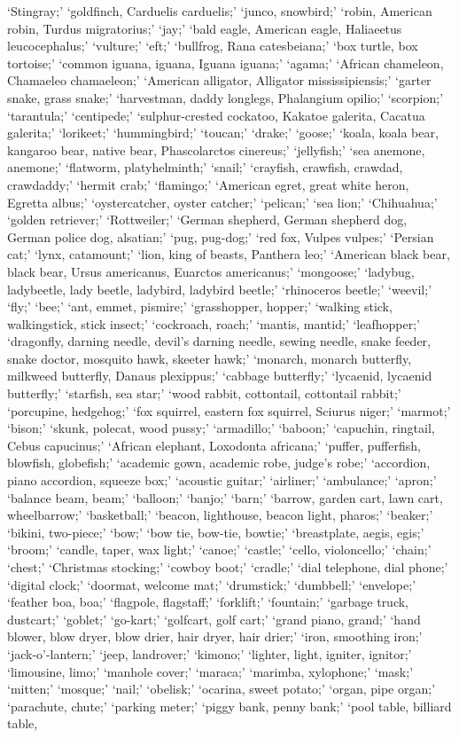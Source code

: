 \documentclass[10pt,twocolumn,letterpaper]{article}
\begin{document}
\noindent`Stingray;' `goldfinch, Carduelis carduelis;' `junco, snowbird;' `robin, American robin, Turdus migratorius;' `jay;' `bald eagle, American eagle, Haliaeetus leucocephalus;' `vulture;' `eft;' `bullfrog, Rana catesbeiana;' `box turtle, box tortoise;' `common iguana, iguana, Iguana iguana;' `agama;' `African chameleon, Chamaeleo chamaeleon;' `American alligator, Alligator mississipiensis;' `garter snake, grass snake;' `harvestman, daddy longlegs, Phalangium opilio;' `scorpion;' `tarantula;' `centipede;' `sulphur-crested cockatoo, Kakatoe galerita, Cacatua galerita;' `lorikeet;' `hummingbird;' `toucan;' `drake;' `goose;' `koala, koala bear, kangaroo bear, native bear, Phascolarctos cinereus;' `jellyfish;' `sea anemone, anemone;' `flatworm, platyhelminth;' `snail;' `crayfish, crawfish, crawdad, crawdaddy;' `hermit crab;' `flamingo;' `American egret, great white heron, Egretta albus;' `oystercatcher, oyster catcher;' `pelican;' `sea lion;' `Chihuahua;' `golden retriever;' `Rottweiler;' `German shepherd, German shepherd dog, German police dog, alsatian;' `pug, pug-dog;' `red fox, Vulpes vulpes;' `Persian cat;' `lynx, catamount;' `lion, king of beasts, Panthera leo;' `American black bear, black bear, Ursus americanus, Euarctos americanus;' `mongoose;' `ladybug, ladybeetle, lady beetle, ladybird, ladybird beetle;' `rhinoceros beetle;' `weevil;' `fly;' `bee;' `ant, emmet, pismire;' `grasshopper, hopper;' `walking stick, walkingstick, stick insect;' `cockroach, roach;' `mantis, mantid;' `leafhopper;' `dragonfly, darning needle, devil's darning needle, sewing needle, snake feeder, snake doctor, mosquito hawk, skeeter hawk;' `monarch, monarch butterfly, milkweed butterfly, Danaus plexippus;' `cabbage butterfly;' `lycaenid, lycaenid butterfly;' `starfish, sea star;' `wood rabbit, cottontail, cottontail rabbit;' `porcupine, hedgehog;' `fox squirrel, eastern fox squirrel, Sciurus niger;' `marmot;' `bison;' `skunk, polecat, wood pussy;' `armadillo;' `baboon;' `capuchin, ringtail, Cebus capucinus;' `African elephant, Loxodonta africana;' `puffer, pufferfish, blowfish, globefish;' `academic gown, academic robe, judge's robe;' `accordion, piano accordion, squeeze box;' `acoustic guitar;' `airliner;' `ambulance;' `apron;' `balance beam, beam;' `balloon;' `banjo;' `barn;' `barrow, garden cart, lawn cart, wheelbarrow;' `basketball;' `beacon, lighthouse, beacon light, pharos;' `beaker;' `bikini, two-piece;' `bow;' `bow tie, bow-tie, bowtie;' `breastplate, aegis, egis;' `broom;' `candle, taper, wax light;' `canoe;' `castle;' `cello, violoncello;' `chain;' `chest;' `Christmas stocking;' `cowboy boot;' `cradle;' `dial telephone, dial phone;' `digital clock;' `doormat, welcome mat;' `drumstick;' `dumbbell;' `envelope;' `feather boa, boa;' `flagpole, flagstaff;' `forklift;' `fountain;' `garbage truck, dustcart;' `goblet;' `go-kart;' `golfcart, golf cart;' `grand piano, grand;' `hand blower, blow dryer, blow drier, hair dryer, hair drier;' `iron, smoothing iron;' `jack-o'-lantern;' `jeep, landrover;' `kimono;' `lighter, light, igniter, ignitor;' `limousine, limo;' `manhole cover;' `maraca;' `marimba, xylophone;' `mask;' `mitten;' `mosque;' `nail;' `obelisk;' `ocarina, sweet potato;' `organ, pipe organ;' `parachute, chute;' `parking meter;' `piggy bank, penny bank;' `pool table, billiard table, 
\end{document}
